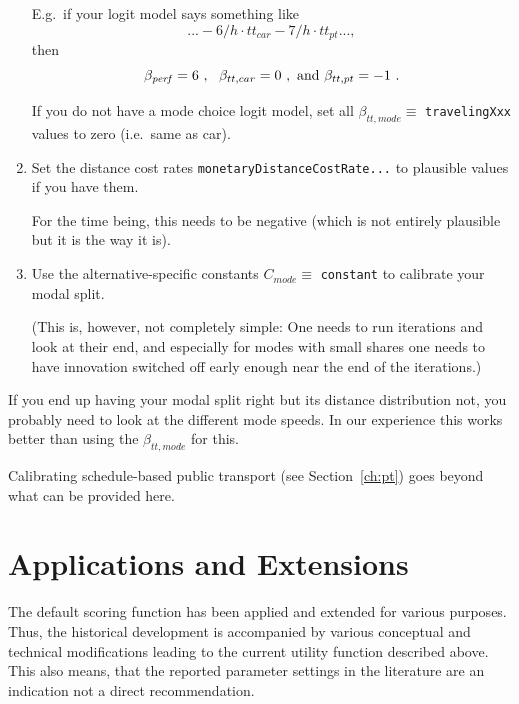 \begin{enumerate}
E.g.\ if your logit model says something like 
\[
... -6/h \cdot tt_{car} - 7/h \cdot tt_{pt} ... ,
\]
then 
\[
\beta_{\it perf} = 6 \ , \ \ \beta_{tt,car} = 0 \ , \hbox{ and } \beta_{tt,pt} = -1 \ .
\]

If you do not have a mode choice logit model, set all $\beta_{tt,mode} \equiv$ \verb$travelingXxx$ values to zero (i.e.\ same as car).

\item Set the distance cost rates \verb$monetaryDistanceCostRate...$ to plausible values if you have them.

For the time being, this needs to be negative (which is not entirely plausible but it is the way it is).

\item Use the alternative-specific constants $C_{mode} \equiv$ \verb$constant$ to calibrate your modal split.

(This is, however, not completely simple: One needs to run iterations and look at their end, and especially for modes with small shares one needs to have innovation switched off early enough near the end of the iterations.)

\end{enumerate}

If you end up having your modal split right but its distance distribution not, you probably need to look at the different mode speeds.  In our experience this works better than using the $\beta_{tt,mode}$ for this.

Calibrating schedule-based public transport (see Section~\ref{ch:pt}) goes beyond what can be provided here.

\section{Applications and Extensions}
\label{sec:appsExtensions}

The default scoring function has been applied and extended for various purposes. 
Thus, the historical development is accompanied by various conceptual and technical modifications leading to the current utility function described above. This also means, that the reported parameter settings in the literature are an indication not a direct recommendation.

